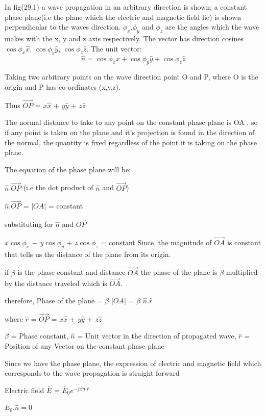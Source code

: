 In fig(29.1) a wave propagation in an arbitrary direction is shown; a constant phase plane(i.e the plane which the electric and magnetic field lie) is shown perpendicular to the waves direction.
$\phi_{x}$,$\phi_{y}$ and $\phi_{z}$ are the angles which the wave makes with the x, y and z axis respectively. 
The vector has direction cosines $\cos\phi_{x}\hat{x}$, $\cos\phi_{y}\hat{y}$, $\cos\phi_{z}\hat{z}$. The unit vector:
\begin{equation}
\hat{n} = \cos\phi_{x}\hat{x} + \cos\phi_{y}\hat{y} + \cos\phi_{z}\hat{z}
\end{equation}

Taking two arbitrary points on the wave direction point O and P, where O is the origin and P has co-ordinates (x,y,z).

Thus $\vec{OP}$ = $x\hat{x}$ + $y\hat{y}$ + $z\hat{z}$

The normal distance to take to any point on the constant phase plane is OA , so if any point is taken on the plane and it's projection is found in the direction of the normal, the quantity is fixed regardless of the point it is taking on the phase plane.

The equation of the phase plane will be:

\begin{center}
$\hat{n}$.$\vec{OP}$ (i.e the dot product of $\hat{n}$ and $\vec{OP}$)

$\hat{n}$.$\vec{OP}$ = $\left|OA \right|$  = constant

substituting for $\hat{n}$ and $\vec{OP}$
\end{center}
$x\cos\phi_{x}$ + $y\cos\phi_{y}$ + $z\cos\phi_{z}$ = constant
Since, the magnitude of $\vec{OA}$ is constant that tells us the distance of the plane from its origin.

if $\beta$ is the phase constant and distance $\vec{OA}$ the phase of the plane is $\beta$ multiplied by the distance traveled which is $\vec{OA}$.

\begin{center}
therefore, Phase of the plane = $\beta$ $\left|OA \right|$ = $\beta$ $\hat{n}.\hat{r}$

where $\hat{r}$ = $\vec{OP}$ = $x\hat{x}$ + $y\hat{y}$ + $z\hat{z}$

\end{center}
$\beta$ = Phase constant,
$\hat{n}$ = Unit vector in the direction of propagated wave,
$\hat{r}$ = Position of any Vector on the constant phase plane

Since we have the phase plane, the expression of electric and magnetic field which corresponds to the wave propagation is straight forward
\begin{center}

Electric field $\bar{E}$ = $\bar{E}_{0}e^{-j\beta \hat{n}.\hat{r}}$

\end{center}
$\bar{E}_{0}.\hat{n} = 0$

